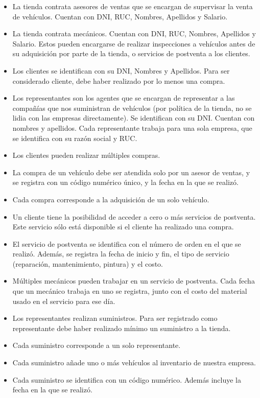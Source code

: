 \documentclass[12pt]{article}
\begin{document}
\begin{itemize}
\item La tienda contrata asesores de ventas que se encargan de supervisar la venta de vehículos. Cuentan con DNI, RUC, Nombres, Apellidos y Salario.
\item La tienda contrata mecánicos. Cuentan con DNI, RUC, Nombres, Apellidos y Salario. Estos pueden encargarse de realizar inspecciones a vehículos antes de su adquisición por parte de la tienda, o servicios de postventa a los clientes.
\item Los clientes se identifican con su DNI, Nombres y Apellidos. Para ser considerado cliente, debe haber realizado por lo menos una compra.
\item Los representantes son los agentes que se encargan de representar a las compañías que nos suministran de vehículos (por política de la tienda, no se lidia con las empresas directamente). Se identifican con su DNI. Cuentan con nombres y apellidos. Cada representante trabaja para una sola empresa, que se identifica con su razón social y RUC.

\item Los clientes pueden realizar múltiples compras.
\item La compra de un vehículo debe ser atendida solo por un asesor de ventas, y se registra con un código numérico único, y la fecha en la que se realizó.
\item Cada compra corresponde a la adquisición de un solo vehículo.

\item Un cliente tiene la posibilidad de acceder a cero o más servicios de postventa. Este servicio sólo está disponible si el cliente ha realizado una compra.
\item El servicio de postventa se identifica con el número de orden en el que se realizó. Además, se registra la fecha de inicio y fin, el tipo de servicio (reparación, mantenimiento, pintura) y el costo.
\item Múltiples mecánicos pueden trabajar en un servicio de postventa. Cada fecha que un mecánico trabaja en uno se registra, junto con el costo del material usado en el servicio para ese día.

\item Los representantes realizan suministros. Para ser registrado como representante debe haber realizado mínimo un suministro a la tienda.
\item Cada suministro corresponde a un solo representante.
\item Cada suministro añade uno o más vehículos al inventario de nuestra empresa.
\item Cada suministro se identifica con un código numérico. Además incluye la fecha en la que se realizó.


\end{itemize}
\end{document}
